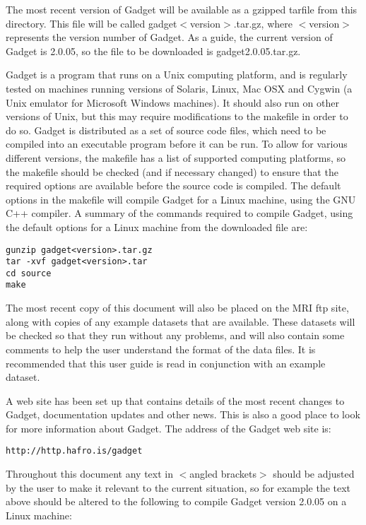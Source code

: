 \documentclass [a4paper, 10pt]{book}
\begin{document}
The most recent version of Gadget will be available as a gzipped tarfile from this directory.  This file will be called gadget$<$version$>$.tar.gz, where $<$version$>$ represents the version number of Gadget.  As a guide, the current version of Gadget is 2.0.05, so the file to be downloaded is gadget2.0.05.tar.gz.

\bigskip
Gadget is a program that runs on a Unix computing platform, and is regularly tested on machines running versions of Solaris, Linux, Mac OSX and Cygwin (a Unix emulator for Microsoft Windows machines).  It should also run on other versions of Unix, but this may require modifications to the makefile in order to do so.  Gadget is distributed as a set of source code files, which need to be compiled into an executable program before it can be run.  To allow for various different versions, the makefile has a list of supported computing platforms, so the makefile should be checked (and if necessary changed) to ensure that the required options are available before the source code is compiled.  The default options in the makefile will compile Gadget for a Linux machine, using the GNU C++ compiler.  A summary of the commands required to compile Gadget, using the default options for a Linux machine from the downloaded file are:

{\small\begin{verbatim}
gunzip gadget<version>.tar.gz
tar -xvf gadget<version>.tar
cd source
make
\end{verbatim}}

The most recent copy of this document will also be placed on the MRI ftp site, along with copies of any example datasets that are available.  These datasets will be checked so that they run without any problems, and will also contain some comments to help the user understand the format of the data files.  It is recommended that this user guide is read in conjunction with an example dataset.

\bigskip
A web site has been set up that contains details of the most recent changes to Gadget, documentation updates and other news.  This is also a good place to look for more information about Gadget.  The address of the Gadget web site is:

{\small\begin{verbatim}
http://http.hafro.is/gadget
\end{verbatim}}

Throughout this document any text in $<$angled brackets$>$ should be adjusted by the user to make it relevant to the current situation, so for example the text above should be altered to the following to compile Gadget version 2.0.05 on a Linux machine:
\end{document}
